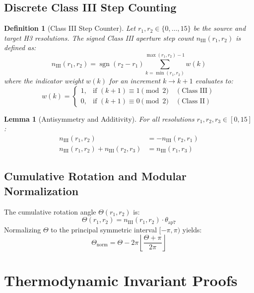 \documentclass[10pt,journal,compsoc]{IEEEtran}
\newtheorem{lemma}{Lemma}
\newtheorem{definition}{Definition}
\begin{document}
\subsection{Discrete Class III Step Counting}
\begin{definition}[Class III Step Counter]
Let $r_1, r_2 \in \{0, \dots, 15\}$ be the source and target H3 resolutions. The signed Class III aperture step count $n_{\text{III}}(r_1, r_2)$ is defined as:
\begin{equation}
    n_{\text{III}}(r_1, r_2) = \operatorname{sgn}(r_2 - r_1) \sum_{k=\min(r_1, r_2)}^{\max(r_1, r_2) - 1} w(k)
\end{equation}
where the indicator weight $w(k)$ for an increment $k \to k+1$ evaluates to:
\begin{equation}
    w(k) = \begin{cases}
    1, & \text{if } (k+1) \equiv 1 \pmod 2 \quad (\text{Class III}) \\
    0, & \text{if } (k+1) \equiv 0 \pmod 2 \quad (\text{Class II})
    \end{cases}
\end{equation}
\end{definition}

\begin{lemma}[Antisymmetry and Additivity]
For all resolutions $r_1, r_2, r_3 \in [0, 15]$:
\begin{align}
    n_{\text{III}}(r_1, r_2) &= -n_{\text{III}}(r_2, r_1) \\
    n_{\text{III}}(r_1, r_2) + n_{\text{III}}(r_2, r_3) &= n_{\text{III}}(r_1, r_3)
\end{align}
\end{lemma}

\subsection{Cumulative Rotation and Modular Normalization}
The cumulative rotation angle $\Theta(r_1, r_2)$ is:
\begin{equation}
    \Theta(r_1, r_2) = n_{\text{III}}(r_1, r_2) \cdot \theta_{\text{ap7}}
\end{equation}
Normalizing $\Theta$ to the principal symmetric interval $[-\pi, \pi)$ yields:
\begin{equation}
    \Theta_{\text{norm}} = \Theta - 2\pi \left\lfloor \frac{\Theta + \pi}{2\pi} \right\rfloor
\end{equation}

\section{Thermodynamic Invariant Proofs}
\end{document}
